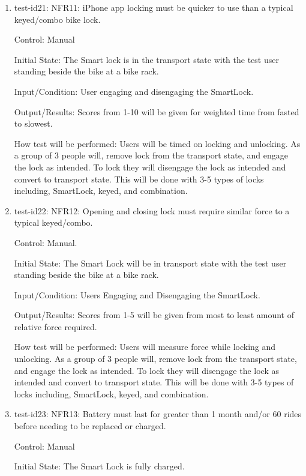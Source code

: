 \documentclass[12pt, titlepage]{article}
\begin{document}
\begin{enumerate}

\item{test-id21: NFR11: iPhone app locking must be quicker to use than a typical keyed/combo bike lock.  \\}

Control: Manual 

Initial State: The Smart lock is in the transport state with the test user standing beside the bike at a bike rack.

Input/Condition: User engaging and disengaging the SmartLock.

Output/Results: Scores from 1-10 will be given for weighted time from fasted to slowest.

How test will be performed: Users will be timed on locking and unlocking. As a group of 3 people will, remove lock from the transport state, and engage the lock as intended. To lock they will disengage the lock as intended and convert to transport state. This will be done with 3-5 types of locks including, SmartLock, keyed, and combination.

\item{test-id22: NFR12: Opening and closing lock must require similar force to a typical keyed/combo.  \\}

Control: Manual.

Initial State: The Smart Lock will be in transport state with the test user standing beside the bike at a bike rack.

Input/Condition: Users Engaging and Disengaging the SmartLock.

Output/Results: Scores from 1-5 will be given from most to least amount of relative force required.

How test will be performed: Users will measure force while locking and unlocking. As a group of 3 people will, remove lock from the transport state, and engage the lock as intended. To lock they will disengage the lock as intended and convert to transport state. This will be done with 3-5 types of locks including, SmartLock, keyed, and combination.

\item{test-id23: NFR13: Battery must last for greater than 1 month and/or 60 rides before needing to be replaced or charged.  \\}

Control: Manual 

Initial State: The Smart Lock is fully charged.


\end{enumerate}
\end{document}

